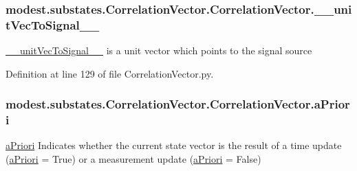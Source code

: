 \subsubsection[{\texorpdfstring{\+\_\+\+\_\+unit\+Vec\+To\+Signal\+\_\+\+\_\+}{__unitVecToSignal__}}]{\setlength{\rightskip}{0pt plus 5cm}modest.\+substates.\+Correlation\+Vector.\+Correlation\+Vector.\+\_\+\+\_\+unit\+Vec\+To\+Signal\+\_\+\+\_\+\hspace{0.3cm}{\ttfamily [private]}}\hypertarget{classmodest_1_1substates_1_1CorrelationVector_1_1CorrelationVector_a8cc03e505f6c1feacdfe9e042fa50549}{}\label{classmodest_1_1substates_1_1CorrelationVector_1_1CorrelationVector_a8cc03e505f6c1feacdfe9e042fa50549}


\hyperlink{classmodest_1_1substates_1_1CorrelationVector_1_1CorrelationVector_a8cc03e505f6c1feacdfe9e042fa50549}{\+\_\+\+\_\+unit\+Vec\+To\+Signal\+\_\+\+\_\+} is a unit vector which points to the signal source 



Definition at line 129 of file Correlation\+Vector.\+py.

\subsubsection[{\texorpdfstring{a\+Priori}{aPriori}}]{\setlength{\rightskip}{0pt plus 5cm}modest.\+substates.\+Correlation\+Vector.\+Correlation\+Vector.\+a\+Priori}\hypertarget{classmodest_1_1substates_1_1CorrelationVector_1_1CorrelationVector_aa3b79d3c66366325f2ef75b701c72458}{}\label{classmodest_1_1substates_1_1CorrelationVector_1_1CorrelationVector_aa3b79d3c66366325f2ef75b701c72458}


\hyperlink{classmodest_1_1substates_1_1CorrelationVector_1_1CorrelationVector_aa3b79d3c66366325f2ef75b701c72458}{a\+Priori} Indicates whether the current state vector is the result of a time update (\hyperlink{classmodest_1_1substates_1_1CorrelationVector_1_1CorrelationVector_aa3b79d3c66366325f2ef75b701c72458}{a\+Priori} = True) or a measurement update (\hyperlink{classmodest_1_1substates_1_1CorrelationVector_1_1CorrelationVector_aa3b79d3c66366325f2ef75b701c72458}{a\+Priori} = False) 



